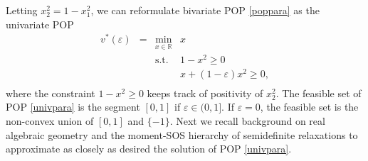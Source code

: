 \documentclass[a4paper,12pt]{article}
\newcommand{\R}{\mathbb{R}} %
\newcommand{\didier}[1]{{\color{red} #1}}
\begin{document}
Letting $x^2_2=1-x^2_1$, we can reformulate bivariate POP \eqref{poppara} as the univariate POP
\begin{equation}\label{univpara}
\begin{array}{rcrl}
v^*(\varepsilon) & = & \min_{x \in \R} & x \\
&&\mathrm{s.t.} &1-x^2 \geq 0 \\
&&& x+(1-\varepsilon)x^2 \geq 0, \\
\end{array}
\end{equation}
where the constraint $1-x^2\geq 0$ keeps track of positivity of $x^2_2$.
The feasible set of POP \eqref{univpara} is the segment $[0,1]$ if $\varepsilon \in (0,1]$. If $\varepsilon=0$, the feasible set is the non-convex union of $[0,1]$ and $\{-1\}$.
Next we recall background on real algebraic geometry and the moment-SOS hierarchy of semidefinite relaxations to approximate as closely as desired the solution of POP \eqref{univpara}. 

\end{document}

